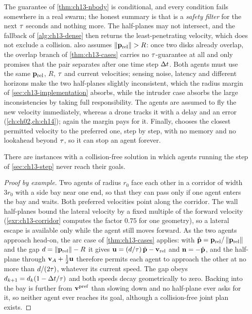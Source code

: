 The guarantee of \cref{thm:ch13-nbody} is conditional, and every condition
fails somewhere in a real swarm; the honest summary is that \orca is a
\emph{safety filter} for the next $\tau$ seconds and nothing more. The
half-planes may not intersect, and the fallback of \cref{alg:ch13-dense}
then returns the least-penetrating velocity, which does not exclude a
collision.  also assumes $\left\lVert \mathbf{p}_{\mathrm{rel}} \right\rVert > R$:
once two disks already overlap, the overlap branch of \cref{thm:ch13-cases}
carries no $\tau$-guarantee at all and only promises that the pair separates
after one time step $\Delta t$. Both agents must
use the same $\mathbf{p}_{\mathrm{rel}}$, $R$, $\tau$ and current velocities;
sensing noise, latency and different horizons make the two half-planes
slightly inconsistent, which the radius margin of
\cref{sec:ch13-implementation} absorbs, while the intruder case absorbs the
large inconsistencies by taking full responsibility. The agents are assumed
to fly the new velocity immediately, whereas a drone tracks it with a delay
and an error (\cref{ch:ch02,ch:ch14}); again the margin pays for it.
Finally, \orca chooses the closest permitted velocity to the preferred one,
step by step, with no memory and no lookahead beyond $\tau$, so it can stop
an agent forever.

\begin{proposition}
\label{thm:ch13-incomplete}
There are instances with a collision-free solution in which agents running the step of \cref{sec:ch13-step} never reach their goals.
\end{proposition}
\begin{proof}[Proof by example]
Two agents of radius $r_0$ face each other in a corridor of width $3r_0$
with a side bay near one end, so that they can pass only if one agent
enters the bay and waits. Both preferred velocities point along the
corridor. The wall half-planes bound the lateral velocity by a fixed multiple
of the forward velocity (\cref{exr:ch13-corridor} computes the factor $0.75$
for one geometry), so a lateral escape is available only while the agent still
moves forward. As the two agents approach head-on, the arc case of
\cref{thm:ch13-cases} applies: with $\hat{\mathbf{p}} = \mathbf{p}_{\mathrm{rel}}/\left\lVert \mathbf{p}_{\mathrm{rel}} \right\rVert$
and the gap $d = \left\lVert \mathbf{p}_{\mathrm{rel}} \right\rVert - R$ it gives
$\mathbf{u} = (d/\tau)\,\hat{\mathbf{p}} - \mathbf{v}_{\mathrm{rel}}$ and
$\mathbf{n} = -\hat{\mathbf{p}}$, and the half-plane through
$\mathbf{v}_A + \tfrac12\mathbf{u}$ therefore permits each agent to approach the other
at no more than $d/(2\tau)$, whatever its current speed. The gap obeys
$d_{k+1} = d_k(1 - \Delta t/\tau)$ and both speeds decay geometrically to zero.
Backing into the bay is further from $\mathbf{v}^{\mathrm{pref}}$ than slowing down
and no half-plane ever asks for it, so neither agent ever reaches its goal,
although a collision-free joint plan exists.
\end{proof}

